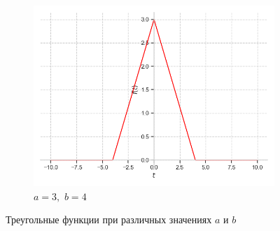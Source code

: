 \documentclass[a4paper, 16pt]{article}
\begin{document}
\begin{figure}[htbp]
\begin{subfigure}{0.3\textwidth}
            \centering
            \includegraphics[width=\linewidth]{trif_a=3_b=4.png}
            \caption{$a=3,\,\,b=4$}
            \label{fig:triangf_3}
        \end{subfigure}
        \caption{Треугольные функции при различных значениях $a$ и $b$}
        \label{fig:triangfs}
    \end{figure}
\end{document}
